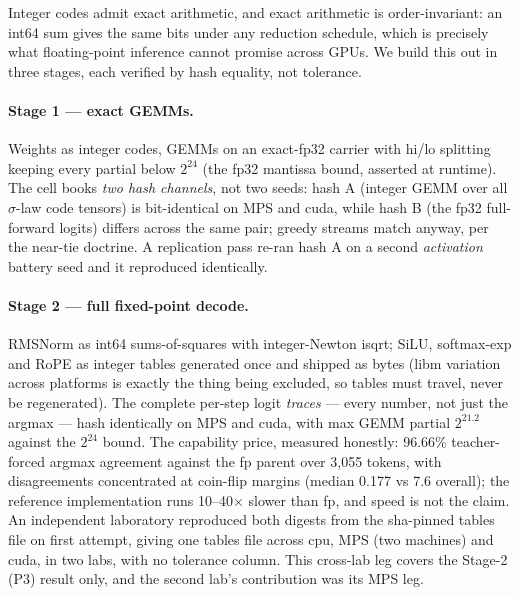 \documentclass[11pt]{article}
\begin{document}
Integer codes admit exact arithmetic, and exact arithmetic is order-invariant:
an int64 sum gives the same bits under any reduction schedule, which is
precisely what floating-point inference cannot promise across GPUs. We build
this out in three stages, each verified by hash equality, not tolerance.

\paragraph{Stage 1 --- exact GEMMs.}
Weights as integer codes, GEMMs on an exact-fp32 carrier with hi/lo splitting
keeping every partial below $2^{24}$ (the fp32 mantissa bound, asserted at
runtime). The cell books \emph{two hash channels}, not two seeds: hash A (integer
GEMM over all $\sigma$-law code tensors) is bit-identical on MPS and cuda, while
hash B (the fp32 full-forward logits) differs across the same pair; greedy
streams match anyway, per the near-tie doctrine. %
A replication pass re-ran hash A on a second \emph{activation} battery seed and
it reproduced identically. %

\paragraph{Stage 2 --- full fixed-point decode.}
RMSNorm as int64 sums-of-squares with integer-Newton isqrt; SiLU, softmax-exp and
RoPE as integer tables generated once and shipped as bytes (libm variation across
platforms is exactly the thing being excluded, so tables must travel, never be
regenerated). The complete per-step logit \emph{traces} --- every number, not
just the argmax --- hash identically on MPS and cuda, with max GEMM partial
$2^{21.2}$ against the $2^{24}$ bound. %
The capability price, measured honestly: 96.66\% teacher-forced argmax agreement
against the fp parent over 3{,}055 tokens, with disagreements concentrated at
coin-flip margins (median 0.177 vs 7.6 overall); the reference implementation
runs 10--40$\times$ slower than fp, and speed is not the claim.
An independent laboratory reproduced both digests from the sha-pinned tables
file on first attempt, giving one tables file across cpu, MPS (two machines) and
cuda, in two labs, with no tolerance column. %
This cross-lab leg covers the Stage-2 (P3) result only, and the second lab's
contribution was its MPS leg.
\end{document}
